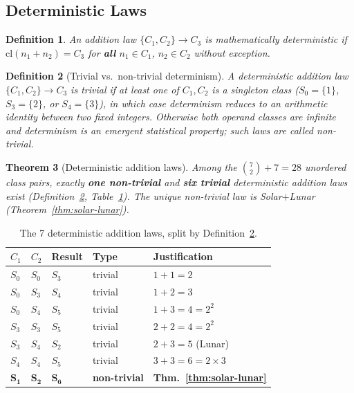 \documentclass[10pt,twocolumn]{article}
\newtheorem{theorem}{Theorem}[section]
\newtheorem{definition}[theorem]{Definition}
\newcommand{\cl}{\mathrm{cl}}
\begin{document}
\subsection{Deterministic Laws}

\begin{definition}\label{def:det-add}
An addition law $\{C_1, C_2\} \to C_3$ is \emph{mathematically
deterministic} if $\cl(n_1 + n_2) = C_3$ for \textbf{all}
$n_1 \in C_1$, $n_2 \in C_2$ without exception.
\end{definition}

\begin{definition}[Trivial vs.\ non-trivial determinism]\label{def:trivial-det}
A deterministic addition law $\{C_1, C_2\} \to C_3$ is \emph{trivial}
if at least one of $C_1, C_2$ is a singleton class
($S_0{=}\{1\}$, $S_3{=}\{2\}$, or $S_4{=}\{3\}$),
in which case determinism reduces to an arithmetic identity between
two fixed integers. Otherwise both operand classes are infinite and
determinism is an emergent statistical property; such laws are called
\emph{non-trivial}.
\end{definition}

\begin{theorem}[Deterministic addition laws]\label{thm:7laws}
Among the $\binom{7}{2}+7=28$ unordered class pairs, exactly
\textbf{one non-trivial} and \textbf{six trivial} deterministic
addition laws exist (Definition~\ref{def:trivial-det},
Table~\ref{tab:7laws}). The unique non-trivial law is Solar$+$Lunar
(Theorem~\ref{thm:solar-lunar}).
\end{theorem}

\begin{table}[htbp]
\centering
\caption{The 7 deterministic addition laws, split by
Definition~\ref{def:trivial-det}.}\label{tab:7laws}
\small
\setlength{\tabcolsep}{3pt}
\begin{tabular}{@{}llllp{2.4cm}@{}}
\toprule
$C_1$ & $C_2$ & Result & Type & Justification \\
\midrule
$S_0$ & $S_0$ & $S_3$ & trivial     & $1+1=2$ \\
$S_0$ & $S_3$ & $S_4$ & trivial     & $1+2=3$ \\
$S_0$ & $S_4$ & $S_5$ & trivial     & $1+3=4=2^2$ \\
$S_3$ & $S_3$ & $S_5$ & trivial     & $2+2=4=2^2$ \\
$S_3$ & $S_4$ & $S_2$ & trivial     & $2+3=5$ (Lunar) \\
$S_4$ & $S_4$ & $S_5$ & trivial     & $3+3=6=2{\times}3$ \\
$\mathbf{S_1}$ & $\mathbf{S_2}$ & $\mathbf{S_6}$ & \textbf{non-trivial} &
\textbf{Thm.~\ref{thm:solar-lunar}} \\
\bottomrule
\end{tabular}
\end{table}
\end{document}
